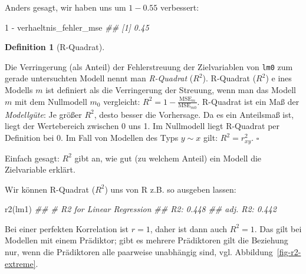 \documentclass[
  a4paper,
]{scrbook}
\newenvironment{Shaded}{\begin{snugshade}}{\end{snugshade}}
\newcommand{\DecValTok}[1]{\textcolor[rgb]{0.68,0.00,0.00}{#1}}
\newcommand{\DocumentationTok}[1]{\textcolor[rgb]{0.37,0.37,0.37}{\textit{#1}}}
\newcommand{\FunctionTok}[1]{\textcolor[rgb]{0.28,0.35,0.67}{#1}}
\newcommand{\NormalTok}[1]{\textcolor[rgb]{0.00,0.23,0.31}{#1}}
\newcommand{\SpecialCharTok}[1]{\textcolor[rgb]{0.37,0.37,0.37}{#1}}
\theoremstyle{definition}
\theoremstyle{definition}
\newtheorem{definition}{Definition}[chapter]
\theoremstyle{definition}
\theoremstyle{remark}
\begin{document}
Anders gesagt, wir haben uns um \(1 - 0.55\) verbessert:

\begin{Shaded}
\begin{Highlighting}[]
\DecValTok{1} \SpecialCharTok{{-}}\NormalTok{ verhaeltnis\_fehler\_mse}
\DocumentationTok{\#\# [1] 0.45}
\end{Highlighting}
\end{Shaded}

\begin{definition}[R-Quadrat]\protect\hypertarget{def-r2}{}\label{def-r2}

Die Verringerung (als Anteil) der Fehlerstreuung der Zielvariablen von
\texttt{lm0} zum gerade untersuchten Modell nennt man \emph{R-Quadrat}
(\(R^2\)). R-Quadrat (\(R^2\)) e ines Modells \(m\) ist definiert als
die Verringerung der Streuung, wenn man das Modell \(m\) mit dem
Nullmodell \(m_0\) vergleicht:
\(R^2 =1-  \frac{\text{MSE}_{m}}{\text{MSE}_{m0}}\). R-Quadrat ist ein
Maß der \emph{Modellgüte}: Je größer \(R^2\), desto besser die
Vorhersage. Da es ein Anteilsmaß ist, liegt der Wertebereich zwischen 0
uns 1. Im Nullmodell liegt R-Quadrat per Definition bei 0. Im Fall von
Modellen des Typs \(y\sim x\) gilt: \(R^2 = r_{xy}^2\). \(\square\)

\end{definition}

Einfach gesagt: \(R^2\) gibt an, wie gut (zu welchem Anteil) ein Modell
die Zielvariable erklärt.

Wir können R-Quadrat (\(R^2\)) uns von R z.B. so ausgeben lassen:

\begin{Shaded}
\begin{Highlighting}[]
\FunctionTok{r2}\NormalTok{(lm1)}
\DocumentationTok{\#\# \# R2 for Linear Regression}
\DocumentationTok{\#\#        R2: 0.448}
\DocumentationTok{\#\#   adj. R2: 0.442}
\end{Highlighting}
\end{Shaded}

Bei einer perfekten Korrelation ist \(r=1\), daher ist dann auch
\(R^2 = 1\). Das gilt bei Modellen mit einem Prädiktor; gibt es mehrere
Prädiktoren gilt die Beziehung nur, wenn die Prädiktoren alle paarweise
unabhängig sind, vgl. Abbildung~\ref{fig-r2-extreme}.
\end{document}
